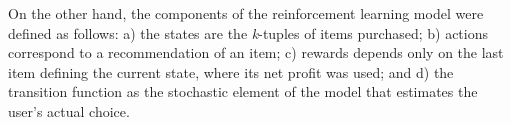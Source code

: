 %


On the other hand, 
the components of the reinforcement learning model were defined as follows: a) the states are the \textit{k}-tuples of items purchased; b) actions correspond to a recommendation of an item; c) rewards depends only on the last item defining the current state, where its net profit was used; and d) the transition function as the stochastic element of the model that estimates the user's actual choice.%

